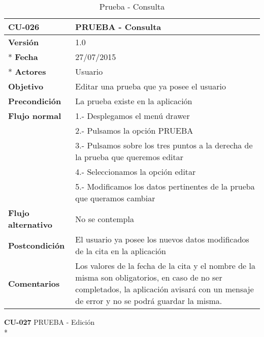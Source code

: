\documentclass[../pfc.tex]{subfiles}
\begin{document}
	\begin{table}[H]
		\centering
		\begin{tabular}[t]{|p{3cm}|p{9.5cm}|}
			\hline \textbf{CU-026} & \textbf{PRUEBA - Consulta} \\*
			\hline\hline \textbf{Versión} & 1.0 \\ *
			\hline\hline \textbf{Fecha} & 27/07/2015 \\ *
			\hline\textbf{Actores} 	& Usuario\\*
			\hline \textbf{Objetivo} & Editar una prueba que ya posee el usuario\\* 			
			\hline \textbf{Precondición} & La prueba existe en la aplicación\\* 
			\hline \textbf{Flujo normal} & 1.- Desplegamos el menú drawer \\* 
			& 2.- Pulsamos la opción PRUEBA\\*	
			& 3.- Pulsamos sobre los tres puntos a la derecha de la prueba que queremos editar\\*	
			& 4.- Seleccionamos la opción editar\\*	
			& 5.- Modificamos los datos pertinentes de la prueba que queramos cambiar\\*	
			\hline \textbf{Flujo alternativo} & No se contempla \\* 
			\hline \textbf{Postcondición} & El usuario ya posee los nuevos datos modificados de la cita en la aplicación \\* 
			\hline \textbf{Comentarios}   & Los valores de la fecha de la cita y el nombre de la misma son obligatorios, en caso de no ser completados, la aplicación avisará con un mensaje de error y no se podrá guardar la misma.\\*
			\hline
		\end{tabular}
		\caption{Prueba - Consulta}
		\label{tabla:caso026}
	\end{table}
	
	\textbf{CU-027}	PRUEBA - Edición\\*
	
\end{document}
